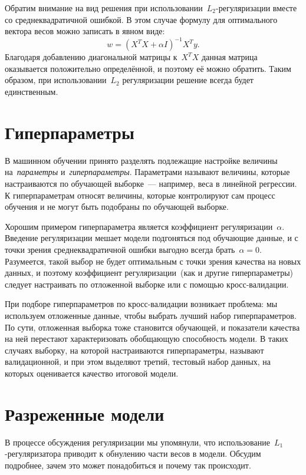 \documentclass[12pt,fleqn]{article}
\begin{document}
Обратим внимание на вид решения при использовании~$L_2$-регуляризации вместе со среднеквадратичной ошибкой.
В этом случае формулу для оптимального вектора весов можно записать в явном виде:
\[
    w
    =
    (X^T X + \alpha I)^{-1} X^T y.
\]
Благодаря добавлению диагональной матрицы к~$X^T X$ данная матрица
оказывается положительно определённой, и поэтому её можно обратить.
Таким образом, при использовании~$L_2$ регуляризации решение всегда будет единственным.

\section{Гиперпараметры}

В машинном обучении принято разделять подлежащие настройке величины
на~\emph{параметры} и~\emph{гиперпараметры}.
Параметрами называют величины, которые настраиваются по обучающей выборке~--- например,
веса в линейной регрессии.
К гиперпараметрам относят величины, которые контролируют сам процесс обучения и
не могут быть подобраны по обучающей выборке.

Хорошим примером гиперпараметра является коэффициент регуляризации~$\alpha$.
Введение регуляризации мешает модели подгоняться под обучающие данные,
и с точки зрения среднеквадратичной ошибки выгодно всегда брать~$\alpha = 0$.
Разумеется, такой выбор не будет оптимальным с точки зрения качества на новых данных,
и поэтому коэффициент регуляризации~(как и другие гиперпараметры) следует
настраивать по отложенной выборке или с помощью кросс-валидации.

При подборе гиперпараметров по кросс-валидации возникает проблема:
мы используем отложенные данные, чтобы выбрать лучший набор гиперпараметров.
По сути, отложенная выборка тоже становится обучающей, и показатели качества на ней
перестают характеризовать обобщающую способность модели.
В таких случаях выборку, на которой настраиваются гиперпараметры,
называют валидационной, и при этом выделяют третий, тестовый набор данных,
на которых оценивается качество итоговой модели.

\section{Разреженные модели}

В процессе обсуждения регуляризации мы упомянули, что использование~$L_1$-регуляризатора
приводит к обнулению части весов в модели.
Обсудим подробнее, зачем это может понадобиться и почему так происходит.
\end{document}

